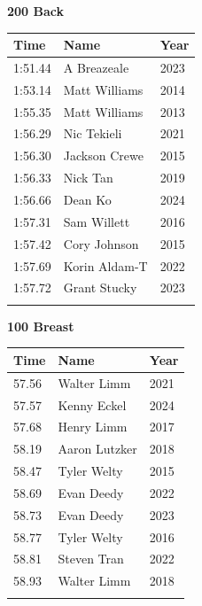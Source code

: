\vspace{1.2em}
\noindent\begin{minipage}[t]{0.48\textwidth}
\centering
\textbf{\textcolor{teamprimary}{200 Back}}\par
\vspace{0.5em}
\centering
\small
\renewcommand{\arraystretch}{1.0}
\setlength{\tabcolsep}{4pt}
\begin{tabular}{@{}p{1.8cm}p{3.0cm}p{1.0cm}@{}}
\toprule
\textbf{Time} & \textbf{Name} & \textbf{Year} \\
\midrule
1:51.44 & A Breazeale & 2023 \\
1:53.14 & Matt Williams & 2014 \\
1:55.35 & Matt Williams & 2013 \\
1:56.29 & Nic Tekieli & 2021 \\
1:56.30 & Jackson Crewe & 2015 \\
1:56.33 & Nick Tan & 2019 \\
1:56.66 & Dean Ko & 2024 \\
1:57.31 & Sam Willett & 2016 \\
1:57.42 & Cory Johnson & 2015 \\
1:57.69 & Korin Aldam-T & 2022 \\
1:57.72 & Grant Stucky & 2023 \\
\bottomrule
\vspace{0.5em}
\end{tabular}
\end{minipage}
\hfill
\begin{minipage}[t]{0.48\textwidth}
\centering
\textbf{\textcolor{teamprimary}{100 Breast}}\par
\vspace{0.5em}
\centering
\small
\renewcommand{\arraystretch}{1.0}
\setlength{\tabcolsep}{4pt}
\begin{tabular}{@{}p{1.8cm}p{3.0cm}p{1.0cm}@{}}
\toprule
\textbf{Time} & \textbf{Name} & \textbf{Year} \\
\midrule
57.56 & Walter Limm & 2021 \\
57.57 & Kenny Eckel & 2024 \\
57.68 & Henry Limm & 2017 \\
58.19 & Aaron Lutzker & 2018 \\
58.47 & Tyler Welty & 2015 \\
58.69 & Evan Deedy & 2022 \\
58.73 & Evan Deedy & 2023 \\
58.77 & Tyler Welty & 2016 \\
58.81 & Steven Tran & 2022 \\
58.93 & Walter Limm & 2018 \\
\bottomrule
\vspace{0.5em}
\end{tabular}
\end{minipage}
